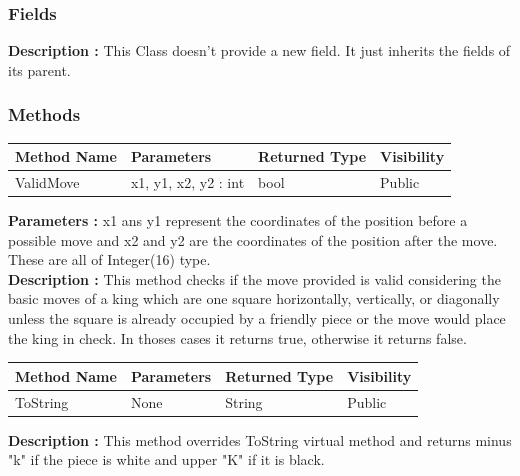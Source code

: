 \documentclass[12pt]{article}
\begin{document}
\subsubsection{Fields}

\textbf{Description :} This Class doesn't provide a new field. It just
inherits the fields of its parent.

\subsubsection{Methods}

\begin{table}[H]
    \begin{tabular}{|l|l|l|l|}
    \hline
    \rowcolor[HTML]{EFEFEF} 
    \cellcolor[HTML]{EFEFEF}\textbf{Method Name} & \textbf{Parameters}  & \textbf{Returned Type} & \textbf{Visibility} \\ \hline
    ValidMove                          & x1, y1, x2, y2 : int & bool                   & Public              \\ \hline
    \end{tabular}
\end{table}

\textbf{Parameters :} x1 ans y1 represent the coordinates of the position before a possible move
and x2 and y2 are the coordinates of the position after the move. These are all of Integer(16) type.
\\
\textbf{Description :} This method checks if the move provided is
valid considering the basic moves of a king which are one square
horizontally, vertically, or diagonally unless the square is already
occupied by a friendly piece or the move would place the king in
check. In thoses cases it returns true, otherwise it returns false.

\begin{table}[H]
    \begin{tabular}{|l|l|l|l|}
    \hline
    \rowcolor[HTML]{EFEFEF} 
    \cellcolor[HTML]{EFEFEF}\textbf{Method Name} & \textbf{Parameters}  & \textbf{Returned Type} & \textbf{Visibility} \\ \hline
    ToString                                   & None                 & String                   & Public              \\ \hline
    \end{tabular}
\end{table}

\textbf{Description :} This method overrides ToString virtual
method and returns minus "k" if the piece is white and upper "K"
if it is black.
\end{document}
